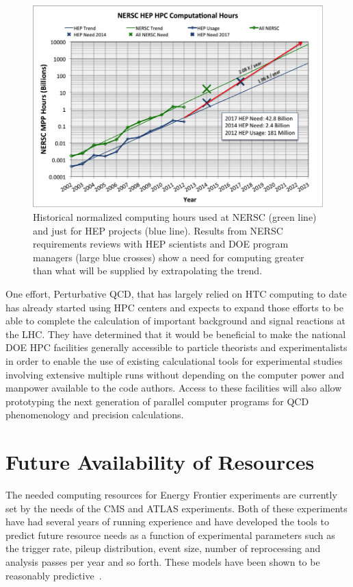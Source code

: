 \begin{figure}[h]
\includegraphics[width=\textwidth]{CpF-I2/images/2013-NERSC-Usage-HEP.png}
\caption{Historical normalized computing hours used at NERSC (green line) and just for HEP projects (blue line). Results from NERSC requirements reviews with HEP scientists and DOE program managers (large blue crosses) show a need for computing greater than what will be supplied by extrapolating the trend.}
\label{fig:NERSC-Computational-Hours}
\end{figure}


One effort, Perturbative QCD,  that has largely relied on HTC computing to date has already started using HPC centers and expects to 
expand those efforts to be able to complete the calculation of important background and signal reactions at the
LHC.  
They have determined that it would be beneficial to make the national DOE HPC
facilities 
generally accessible to particle theorists and
experimentalists in order to enable the use of existing
calculational tools for experimental studies involving extensive
multiple runs without depending on the computer power and manpower
available to the code authors. Access to these facilities will also
allow prototyping the next generation of parallel computer programs
for QCD phenomenology and precision calculations.

 
\section{Future Availability of Resources}


The needed computing resources for Energy Frontier experiments are currently set by the needs of the CMS and ATLAS experiments.  Both of these experiments have had several years of running experience and have developed the tools to predict future resource needs as a function of experimental parameters such as the trigger rate, pileup distribution, event size, number of reprocessing and analysis passes per year and so forth.  These models have been shown to be reasonably predictive~\cite{bib:CHEPresources}.

